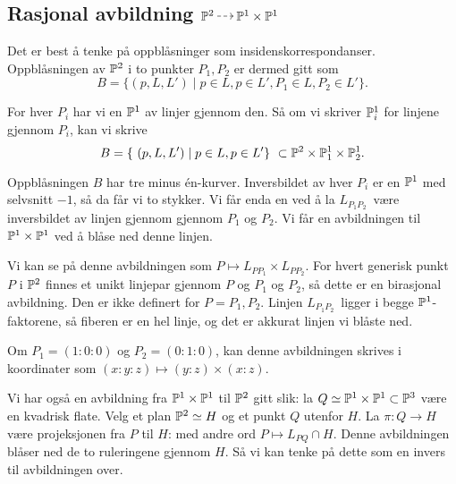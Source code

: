 \documentclass[11pt, norsk]{article}
\begin{document}
\subsection{Rasjonal avbildning $\PP^2 \rmap \PP^1 \times \PP^1$}

Det er best å tenke på oppblåsninger som insidenskorrespondanser. Oppblåsningen av $\mathbb{P}^2$ i to punkter $P_1, P_2$ er dermed gitt som
$$
B = \{ (p,L,L') \mid p \in L, p \in L', P_1 \in L, P_2 \in L' \}.
$$

For hver $P_i$ har vi en $\mathbb{P}^1$ av linjer gjennom den. Så om vi skriver $\mathbb{P}_i^1$ for linjene gjennom $P_i$, kan vi skrive
$$
B = \{ (p,L,L') \mid p \in L, p \in L'\} \subset \PP^2 \times \PP_1^1 \times \PP_2^1.
$$

Oppblåsningen $B$ har tre minus én-kurver. Inversbildet av hver $P_i$ er en $\mathbb{P}^1$ med selvsnitt $-1$, så da får vi to stykker. Vi får enda en ved å la $L_{P_1P_2}$ være inversbildet av linjen gjennom gjennom $P_1$ og $P_2$. Vi får en avbildningen til $\mathbb{P}^1 \times \mathbb{P}^1$ ved å blåse ned denne linjen. 

Vi kan se på denne avbildningen som $P \mapsto L_{PP_1} \times L_{PP_2}$. For hvert generisk punkt $P$ i $\mathbb{P}^2$ finnes et unikt linjepar gjennom $P$ og $P_1$ og $P_2$, så dette er en birasjonal avbildning. Den er ikke definert for $P=P_1,P_2$. Linjen $L_{P_1P_2}$ ligger i begge $\mathbb{P}^1$-faktorene, så fiberen er en hel linje, og det er akkurat linjen vi blåste ned.

Om $P_1=(1:0:0)$ og $P_2=(0:1:0)$, kan denne avbildningen skrives i koordinater som $(x:y:z) \mapsto (y:z) \times (x:z)$. 

Vi har også en avbildning fra $\mathbb{P}^1 \times \mathbb{P}^1$ til $\mathbb{P}^2$ gitt slik: la $Q \simeq \mathbb{P}^1 \times \mathbb{P}^1 \subset \mathbb{P}^3$ være en kvadrisk flate. Velg et plan $\mathbb{P}^2 \simeq H$ og et punkt $Q$ utenfor $H$. La $\pi:Q \to H$ være projeksjonen fra $P$ til $H$: med andre ord $P \mapsto L_{PQ} \cap H$. Denne avbildningen blåser ned de to ruleringene gjennom $H$. Så vi kan tenke på dette som en invers til avbildningen over.
\end{document}
